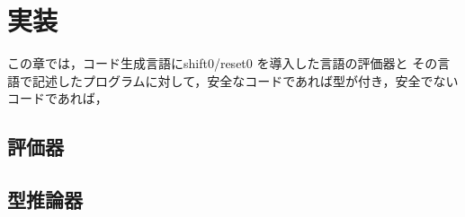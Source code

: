 \chapter{実装}
この章では，コード生成言語にshift0/reset0 を導入した言語の評価器と
その言語で記述したプログラムに対して，安全なコードであれば型が付き，安全でないコードであれば，

\section{評価器}

\section{型推論器}





